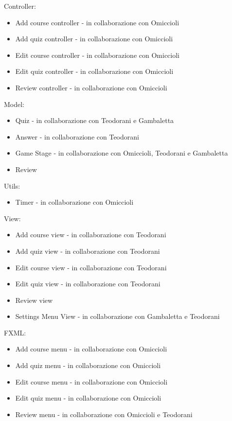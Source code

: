    Controller:
    \begin{itemize}
        \item Add course controller - in collaborazione con Omiccioli 
        \item Add quiz controller - in collaborazione con Omiccioli
        \item Edit course controller - in collaborazione con Omiccioli
        \item Edit quiz controller - in collaborazione con Omiccioli
        \item Review controller - in collaborazione con Omiccioli
    \end{itemize}    
    Model:
    \begin{itemize}
        \item Quiz - in collaborazione con Teodorani e Gambaletta
        \item Answer - in collaborazione con Teodorani
        \item Game Stage - in collaborazione con Omiccioli, Teodorani e Gambaletta
        \item Review 
    \end{itemize}
    Utils:
    \begin{itemize}
        \item Timer - in collaborazione con Omiccioli
    \end{itemize}
    View:
    \begin{itemize}
        \item Add course view  - in collaborazione con Teodorani
        \item Add quiz view - in collaborazione con Teodorani
        \item Edit course view - in collaborazione con Teodorani
        \item Edit quiz view - in collaborazione con Teodorani
        \item Review view
        \item Settings Menu View - in collaborazione con Gambaletta e Teodorani
    \end{itemize}
    FXML:
    \begin{itemize}
        \item Add course menu - in collaborazione con Omiccioli
        \item Add quiz menu - in collaborazione con Omiccioli
        \item Edit course menu - in collaborazione con Omiccioli
        \item Edit quiz menu - in collaborazione con Omiccioli
        \item Review menu - in collaborazione con Omiccioli e Teodorani
    \end{itemize}
    
